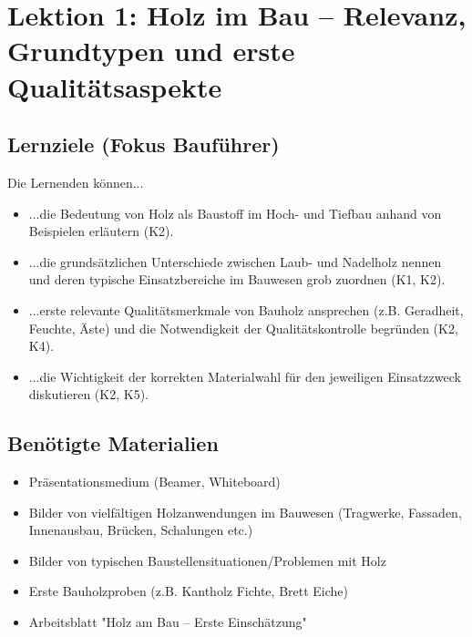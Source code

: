 \documentclass[12pt, a4paper]{article}
\begin{document}
\section{Lektion 1: Holz im Bau – Relevanz, Grundtypen und erste Qualitätsaspekte}
\subsection{Lernziele (Fokus Bauführer)}
Die Lernenden können...
\begin{itemize}
    \item ...die Bedeutung von Holz als Baustoff im Hoch- und Tiefbau anhand von Beispielen erläutern (K2).
    \item ...die grundsätzlichen Unterschiede zwischen Laub- und Nadelholz nennen und deren typische Einsatzbereiche im Bauwesen grob zuordnen (K1, K2).
    \item ...erste relevante Qualitätsmerkmale von Bauholz ansprechen (z.B. Geradheit, Feuchte, Äste) und die Notwendigkeit der Qualitätskontrolle begründen (K2, K4).
    \item ...die Wichtigkeit der korrekten Materialwahl für den jeweiligen Einsatzzweck diskutieren (K2, K5).
\end{itemize}

\subsection{Benötigte Materialien}
\begin{itemize}
    \item Präsentationsmedium (Beamer, Whiteboard)
    \item Bilder von vielfältigen Holzanwendungen im Bauwesen (Tragwerke, Fassaden, Innenausbau, Brücken, Schalungen etc.)
    \item Bilder von typischen Baustellensituationen/Problemen mit Holz
    \item Erste Bauholzproben (z.B. Kantholz Fichte, Brett Eiche)
    \item Arbeitsblatt "Holz am Bau – Erste Einschätzung"
\end{itemize}
\end{document}
